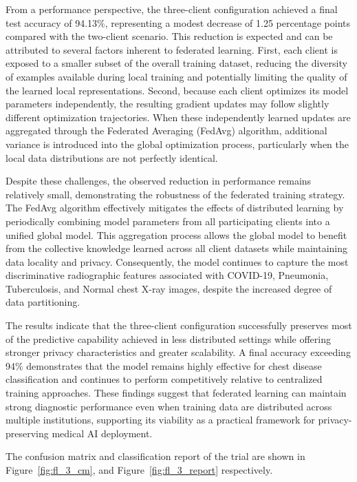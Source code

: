 From a performance perspective, the three-client configuration achieved a final test accuracy of 94.13\%, representing a modest decrease of 1.25 percentage points compared with the two-client scenario. This reduction is expected and can be attributed to several factors inherent to federated learning. First, each client is exposed to a smaller subset of the overall training dataset, reducing the diversity of examples available during local training and potentially limiting the quality of the learned local representations. Second, because each client optimizes its model parameters independently, the resulting gradient updates may follow slightly different optimization trajectories. When these independently learned updates are aggregated through the Federated Averaging (FedAvg) algorithm, additional variance is introduced into the global optimization process, particularly when the local data distributions are not perfectly identical.

Despite these challenges, the observed reduction in performance remains relatively small, demonstrating the robustness of the federated training strategy. The FedAvg algorithm effectively mitigates the effects of distributed learning by periodically combining model parameters from all participating clients into a unified global model. This aggregation process allows the global model to benefit from the collective knowledge learned across all client datasets while maintaining data locality and privacy. Consequently, the model continues to capture the most discriminative radiographic features associated with COVID-19, Pneumonia, Tuberculosis, and Normal chest X-ray images, despite the increased degree of data partitioning.

The results indicate that the three-client configuration successfully preserves most of the predictive capability achieved in less distributed settings while offering stronger privacy characteristics and greater scalability. A final accuracy exceeding 94\% demonstrates that the model remains highly effective for chest disease classification and continues to perform competitively relative to centralized training approaches. These findings suggest that federated learning can maintain strong diagnostic performance even when training data are distributed across multiple institutions, supporting its viability as a practical framework for privacy-preserving medical AI deployment.

The confusion matrix and classification report of the trial are shown in Figure~\ref{fig:fl_3_cm}, and Figure~\ref{fig:fl_3_report} respectively.

